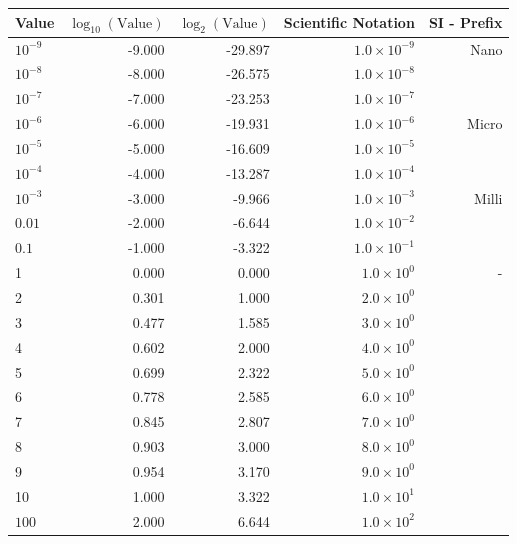 \begin{table}[h]
    \centering
    \renewcommand{\arraystretch}{1.2}
    \begin{tabular}{|l|r|r|r|r|}
        \hline
        \textbf{Value} & \(\log_{10}(\text{Value})\) & \(\log_{2}(\text{Value})\) & Scientific Notation & SI - Prefix \\
        \hline
        \(10^{-9}\)   & -9.000  & -29.897 & \(1.0 \times 10^{-9}\) & Nano \\
        \(10^{-8}\)   & -8.000  & -26.575 & \(1.0 \times 10^{-8}\) & \\
        \(10^{-7}\)   & -7.000  & -23.253 & \(1.0 \times 10^{-7}\) & \\
        \(10^{-6}\)   & -6.000  & -19.931 & \(1.0 \times 10^{-6}\) & Micro \\
        \(10^{-5}\)   & -5.000  & -16.609 & \(1.0 \times 10^{-5}\) & \\
        \(10^{-4}\)   & -4.000  & -13.287 & \(1.0 \times 10^{-4}\) & \\
        \(10^{-3}\)   & -3.000  & -9.966  & \(1.0 \times 10^{-3}\) & Milli \\
        \(0.01\)   & -2.000  & -6.644  & \(1.0 \times 10^{-2}\) & \\
        \(0.1\)   & -1.000  & -3.322  & \(1.0 \times 10^{-1}\) & \\
        \hline
        1             & 0.000   & 0.000   & \(1.0 \times 10^{0}\) & - \\
        2             & 0.301   & 1.000   & \(2.0 \times 10^{0}\) & \\
        3             & 0.477   & 1.585   & \(3.0 \times 10^{0}\) & \\
        4             & 0.602   & 2.000   & \(4.0 \times 10^{0}\) & \\
        5             & 0.699   & 2.322   & \(5.0 \times 10^{0}\) & \\
        6             & 0.778   & 2.585   & \(6.0 \times 10^{0}\) & \\
        7             & 0.845   & 2.807   & \(7.0 \times 10^{0}\) & \\
        8             & 0.903   & 3.000   & \(8.0 \times 10^{0}\) & \\
        9             & 0.954   & 3.170   & \(9.0 \times 10^{0}\) & \\
        10            & 1.000   & 3.322   & \(1.0 \times 10^{1}\) & \\
        \hline
        \(100\)      & 2.000   & 6.644   & \(1.0 \times 10^{2}\) & \\

\end{tabular}
\end{table}
